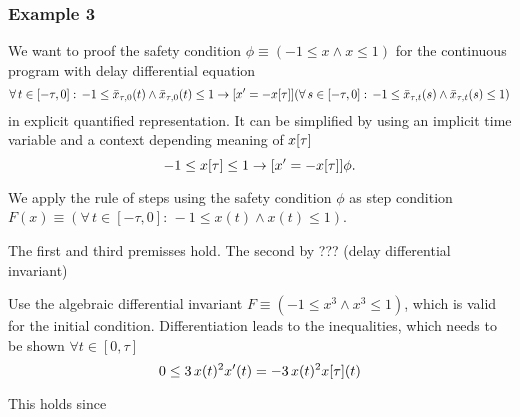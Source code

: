 \documentclass[10pt]{report}
\begin{document}
            \subsubsection{Example 3}
                \label{sec:ddi-example-3}

                We want to proof the safety condition $\phi\equiv(-1\leq x\wedge x\leq 1)$ for the continuous program with delay differential equation
                \begin{equation}
                    \forall\,t\in[-\tau,0]:\,-1\leq\xbartaut{0}(t)\wedge\xbartaut{0}(t)\leq 1
                    \rightarrow
                    [x'=-\xtau] (\forall\,s\in[-\tau,0]:\,-1\leq\xbartaut{t}(s)\wedge\xbartaut{t}(s)\leq 1)
                \end{equation}
                in explicit quantified representation. It can be simplified by using an implicit time variable and a context depending meaning of $\xtau$
                \begin{equation}
                    -1\leq\xtau\leq 1 \rightarrow [x'=-\xtau]\phi.
                \end{equation}

                We apply the rule of steps using the safety condition $\phi$ as step condition $F(x)\equiv(\forall\,t\in[-\tau,0]:\,-1\leq x(t)\wedge x(t)\leq 1)$.

                The first and third premisses hold. The second by ??? (delay differential invariant)

                Use the algebraic differential invariant $F\equiv(-1\leq x^3\wedge x^3\leq1)$, which is valid for the initial condition. Differentiation leads to the inequalities, which needs to be shown $\forall t\in[0,\tau]$
                \begin{equation}
                    0\leq 3\,x(t)^2 x'(t) = -3\,x(t)^2 \xtau(t)
                \end{equation}

                This holds since



\nocite{*}


\end{document}
